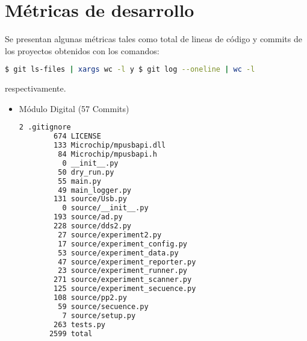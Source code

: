 \section{M\'etricas de desarrollo}

Se presentan algunas m\'etricas tales como total de lineas de c\'odigo y commits de los proyectos
obtenidos con los comandos:
\begin{lstlisting}[language=bash]
    $ git ls-files | xargs wc -l y $ git log --oneline | wc -l
\end{lstlisting}
respectivamente.
  
\begin{itemize}
\item Módulo Digital (57 Commits)
\begin{lstlisting}[language=bash]
        2 .gitignore
        674 LICENSE
        133 Microchip/mpusbapi.dll
         84 Microchip/mpusbapi.h
          0 __init__.py
         50 dry_run.py
         55 main.py
         49 main_logger.py
        131 source/Usb.py
          0 source/__init__.py
        193 source/ad.py
        228 source/dds2.py
         27 source/experiment2.py
         17 source/experiment_config.py
         53 source/experiment_data.py
         47 source/experiment_reporter.py
         23 source/experiment_runner.py
        271 source/experiment_scanner.py
        125 source/experiment_secuence.py
        108 source/pp2.py
         59 source/secuence.py
          7 source/setup.py
        263 tests.py
       2599 total
    \end{lstlisting}


\end{itemize}
